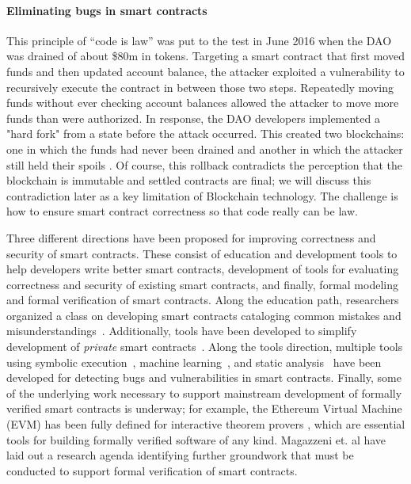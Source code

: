 \paragraph{Eliminating bugs in smart contracts}
This principle of ``code is law'' was put to the test in June 2016 when the DAO was drained of about \$80m in tokens. Targeting a smart contract that first moved funds and then updated account balance, the attacker exploited a vulnerability to recursively execute the contract in between those two steps. Repeatedly moving funds without ever checking account balances allowed the attacker to move more funds than were authorized. In response, the DAO developers implemented a "hard fork" from a state before the attack occurred. This created two blockchains: one in which the funds had never been drained and another in which the attacker still held their spoils \cite{Castillo16}. Of course, this rollback contradicts the perception that the blockchain is immutable and settled contracts are final; we will discuss this contradiction later as a key limitation of Blockchain technology. The challenge is how to ensure smart contract correctness so that code really can be law.

Three different directions have been proposed for improving correctness and security of smart contracts.  These consist of education and development tools to help developers write better smart contracts, development of tools for evaluating correctness and security of existing smart contracts, and finally, formal modeling and formal verification of smart contracts.  Along the education path, researchers organized a class on developing smart contracts cataloging common mistakes and misunderstandings~\cite{FC:DAKMS16}.  Additionally, tools have been developed to simplify development of \emph{private} smart contracts~\cite{SP:KMSWP16}.  Along the tools direction, multiple tools using symbolic execution~\cite{CCS:LCOSH16}, machine learning~\cite{arxiv:Huang18}, and static analysis~\cite{CCS:BDFGGK+16,NDSS:KGDS18} have been developed for detecting bugs and vulnerabilities in smart contracts.  Finally, some of the underlying work necessary to support mainstream development of formally verified smart contracts is underway; for example, the Ethereum Virtual Machine (EVM) has been fully defined for interactive theorem provers \cite{Hirai17}, which are essential tools for building formally verified software of any kind. Magazzeni et. al \cite{Magazzeni17} have laid out a research agenda identifying further groundwork that must be conducted to support formal verification of smart contracts.


